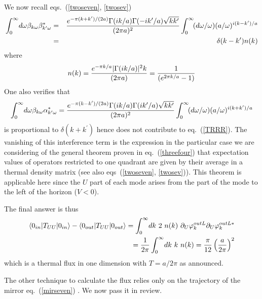 \documentclass[12pt,oneside]{report}
\def\om{\omega	}
\def\beq {\begin{equation}}
\def\feq {\end{equation}}
\def\beqa {\begin{eqnarray}}
\def\feqa {\end{eqnarray}}
\def\p {\prime}
\begin{document}
We now recall eqs.~(\ref{twoseven}, \ref{twosev})
\beqa
\int_0^\infty\! d\om
\beta_{k\om}\beta^{*}_{k^\p\om}&=&
{{e^{-\pi(k+k^\p)/(2a)}\Gamma(ik/a)\Gamma(-ik^\p/a) \sqrt{kk^\p}}\over {(2 \pi
a)^{2}}} \int_0^\infty\! (d\om /\om) (a/\om)^{i(k-k^\p)/a}\nonumber\\
&=&\delta (k - k^\p) n(k)\label{TRRRBBB}
\feqa 
where
\beq
n(k)={{e^{-\pi k/a}|\Gamma(ik/a)|^2 k}\over {(2 \pi a)}}={1\over {(e^{2\pi
k/a}-1)}}
\feq
One also verifies  that
\beq
 \int_0^\infty\! d\om \beta_{k\om}\alpha^{*}_{k^\p\om}=
{{e^{-\pi(k-k^\p)/(2a)}\Gamma(ik/a)\Gamma(ik^\p/a) \sqrt{kk^\p}}\over {(2 \pi
a)^{2}}} \int_0^\infty\! (d\om /\om) (a/\om)^{i(k+k^\p)/a}
\feq
is proportional to $\delta(k+ k^\p)$
hence does not contribute to eq.~(\ref{TRRR}). The vanishing of this interference
term is the expression in the particular case we are considering  of the general
theorem proven in eq.~(\ref{threefour})  that expectation values of operators
restricted to one quadrant are given by their 
average in a thermal density matrix (see also eqs~(\ref{twoseven},
\ref{twosev})).
This theorem is applicable here since the $U$
 part of each mode arises from the part of the
mode to the left of the horizon ($V<0$).

The final answer is thus \begin{eqnarray}
\langle 0_{in} \vert T_{UU} \vert 0_{in} \rangle -
\langle 0_{out} \vert T_{UU} \vert 0_{out}\rangle
= \int_0^\infty \! dk\ 2\ n(k)\ \partial_U\varphi_{k}^{out  L}
 \partial_U \varphi_{k}^{out L *}\nonumber \\
={1 \over 2 \pi} \int_0^\infty\! dk \ k \ n(k)
= {\pi \over 12} \left({a \over 2 \pi }\right)^2\label{TRRRR}
\end{eqnarray} 
which is a thermal flux in one dimension with $T= a/ 2 \pi$ as
announced.


The other technique to calculate the flux 
relies only on the trajectory
of the mirror eq.~(\ref{mirseven}) \cite{DFU}. We now pass it in review.
\end{document}
